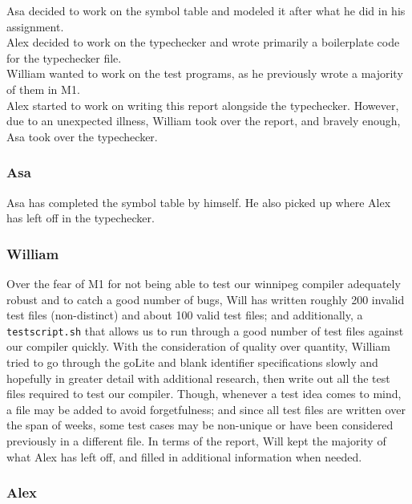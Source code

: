 \documentclass{article}
\begin{document}
 Asa decided to work on the symbol table and modeled it after what he did in his assignment. \\
 Alex decided to work on the typechecker and wrote primarily a boilerplate code for the typechecker file. \\
 William wanted to work on the test programs, as he previously wrote a majority of them in M1. \\
 Alex started to work on writing this report alongside the typechecker. However, due to an unexpected illness, William took over the report, and bravely enough, Asa took over the typechecker.

\subsubsection{Asa}

Asa has completed the symbol table by himself. He also picked up where Alex has left off in the typechecker. 

\subsubsection{William}

Over the fear of M1 for not being able to test our winnipeg compiler adequately robust and to catch a good number of bugs, Will has written roughly 200 invalid test files (non-distinct) and about 100 valid test files; and additionally, a \verb|testscript.sh| that allows us to run through a good number of test files against our compiler quickly. With the consideration of quality over quantity, William tried to go through the goLite and blank identifier specifications slowly and hopefully in greater detail with additional research, then write out all the test files required to test our compiler. Though, whenever a test idea comes to mind, a file may be added to avoid forgetfulness; and since all test files are written over the span of weeks, some test cases may be non-unique or have been considered previously in a different file. In terms of the report, Will kept the majority of what Alex has left off, and filled in additional information when needed.

\subsubsection{Alex}
\end{document}
